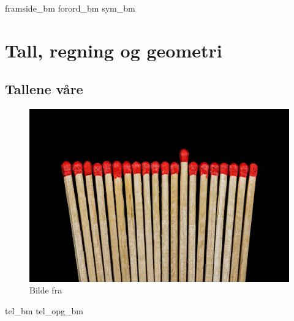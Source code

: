 



\addto\captionsenglish{\renewcommand{\figurename}{Figur}}
\makeatletter
\addto\captionsenglish{\renewcommand{\chaptername}{Kapittel}}
\addto\captionsenglish{\renewcommand{\partname}{Del}}
\addto\captionsenglish{\renewcommand{\contentsname}{Innhold}}


	

{framside_bm}
{forord_bm}
{sym_bm}
\newpage

{\footnotesize \tableofcontents}
\newpage
\part{Tall, regning og geometri}

\chapter{Tallene våre \label{Talavare}}
\begin{figure}
	\centering
	\includegraphics[scale=0.25]{sticks} \\
	{\footnotesize Bilde fra } 
\end{figure}
\newpage
{tel_bm}
{tel_opg_bm}

